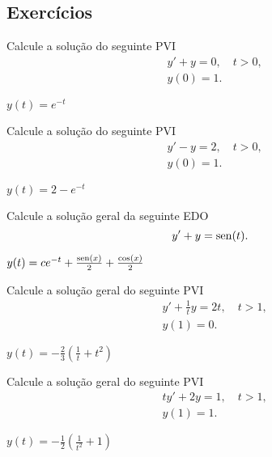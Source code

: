 \subsection*{Exercícios}

\begin{exer}
  Calcule a solução do seguinte PVI
  \begin{align}
    &y' + y = 0, \quad t>0, \\
    &y(0) = 1.    
  \end{align}
\end{exer}
\begin{resp}
  $y(t) = e^{-t}$
\end{resp}

\begin{exer}
  Calcule a solução do seguinte PVI
  \begin{align}
    &y' - y = 2, \quad t>0, \\
    &y(0) = 1.    
  \end{align}
\end{exer}
\begin{resp}
  $y(t) = 2 - e^{-t}$
\end{resp}

\begin{exer}
  Calcule a solução geral da seguinte EDO
  \begin{equation}
    y' + y = \operatorname{sen}(t).
  \end{equation}
\end{exer}
\begin{resp}
  $y(t) = ce^{-t} + \frac{\operatorname{sen}(x)}{2} + \frac{\cos(x)}{2}$
\end{resp}

\begin{exer}
  Calcule a solução geral do seguinte PVI
  \begin{align}
    &y' + \frac{1}{t}y = 2t,\quad t>1,\\
    &y(1) = 0.
  \end{align}
\end{exer}
\begin{resp}
  $y(t) = -\frac{2}{3}\left(\frac{1}{t} + t^2\right)$
\end{resp}

\begin{exer}
  Calcule a solução geral do seguinte PVI
  \begin{align}
    &ty' + 2y = 1,\quad t>1,\\
    &y(1) = 1.
  \end{align}
\end{exer}
\begin{resp}
  $y(t) = -\frac{1}{2}\left(\frac{1}{t^2} + 1\right)$
\end{resp}


